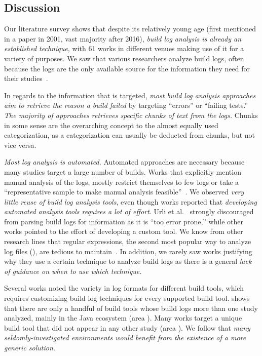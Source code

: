 \subsection{Discussion}
\label{sec:lit-sur:discussion}

Our literature survey shows that despite its relatively young age
(first mentioned in a paper in 2001, vast majority after
2016), \emph{build log analysis is already an established technique,}
with 61 works in different venues making use of it for a variety of
purposes.
We saw that various researchers analyze build logs, often because the
logs are the only available source for the
information they need for their studies~\cite{ren2018automated,
seo2014programmers,beller2017oops,zampetti2017open,rausch2017empirical}.

In regards to the information that is targeted, \emph{most build log
analysis approaches aim to retrieve the reason a build failed} by
targeting ``errors'' or ``failing tests.''
\emph{The majority of approaches retrieves specific chunks of
text from the logs.} Chunks in some sense are the overarching concept to
the almost equally used categorization, as a categorization can usually
be deducted from chunks, but not vice versa.

\emph{Most log analysis is automated.} Automated approaches are
necessary because many studies target a large number of builds.
Works
that explicitly mention manual analysis of the logs, mostly
restrict themselves to few logs or take a ``representative sample to
make manual analysis feasible''~\cite{zolfagharinia2017not}.
We observed \emph{very little reuse of build log analysis tools},
even though works reported that
\emph{developing automated analysis tools requires a lot of effort}.
Urli et al.~\cite{urli2018design} strongly discouraged from parsing
build logs for information as it is ``too error prone,'' while other
works pointed to the effort of developing a custom tool.
We know from other research lines that regular expressions, the second
most popular way to analyze log files (),
are tedious to
maintain~\cite{michael2019regexes}.
In addition, we rarely saw works justifying why they use a certain
technique to analyze build logs as there is a general \emph{lack of
guidance on when to use which technique.}

Several works noted the variety in log formats for different build
tools, which requires customizing build log techniques for
every supported build tool.
 shows that there are only a handful of
build tools whose build logs more than one study analyzed, mainly in
the Java ecosystem (area ).
Many works target a unique build tool that did not appear in any other
study (area ).
We follow that \emph{many seldomly-investigated
environments would benefit from the
existence of a more generic solution.}

